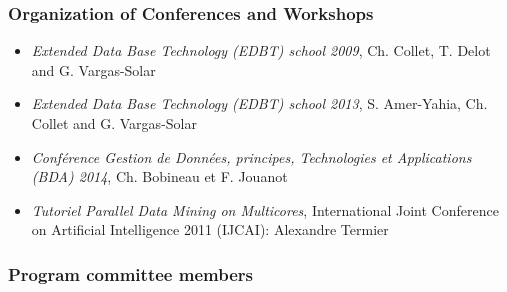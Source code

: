 \subsubsection*{Organization of Conferences and Workshops}

\begin{itemize}
\setlength{\itemindent}{-0.5cm}
\setlength{\itemsep}{-0.1cm}

\item \emph{Extended Data Base Technology (EDBT) school 2009}, Ch. Collet, T. Delot and G. Vargas-Solar

\item \emph{Extended Data Base Technology (EDBT) school 2013}, S.  Amer-Yahia, Ch. Collet and G. Vargas-Solar

\item \emph{Conf{\'e}rence Gestion de Donn{\'e}es, principes, Technologies et Applications (BDA) 2014}, Ch. Bobineau et F. Jouanot
 
 \item \emph{Tutoriel Parallel Data Mining on Multicores}, International Joint Conference on Artificial Intelligence  2011 (IJCAI): Alexandre Termier

\end{itemize}

\subsubsection*{Program committee members}

